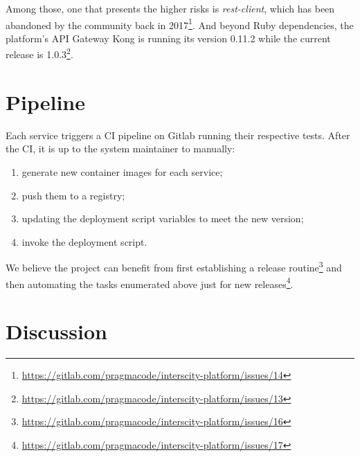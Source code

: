 \documentclass[paper=a4, fontsize=11pt]{scrartcl}
\numberwithin{equation}{section}    %
\numberwithin{figure}{section}      %
\numberwithin{table}{section}        %
\begin{document}
  Among those, one that presents the higher risks is \textit{rest-client}, which has been abandoned by the community back in 2017\footnote{\url{https://gitlab.com/pragmacode/interscity-platform/issues/14}}. And beyond Ruby dependencies, the platform's API Gateway Kong is running its version 0.11.2 while the current release is 1.0.3\footnote{\url{https://gitlab.com/pragmacode/interscity-platform/issues/13}}.

\section{Pipeline}
  Each service triggers a CI pipeline on Gitlab running their respective tests. After the CI, it is up to the system maintainer to manually:

  \begin{enumerate}
    \item generate new container images for each service;
    \item push them to a registry;
    \item updating the deployment script variables to meet the new version;
    \item invoke the deployment script.
  \end{enumerate}

  We believe the project can benefit from first establishing a release routine\footnote{\url{https://gitlab.com/pragmacode/interscity-platform/issues/16}} and then automating the tasks enumerated above just for new releases\footnote{\url{https://gitlab.com/pragmacode/interscity-platform/issues/17}}.

\section{Discussion}
\label{sec:discussion}
\end{document}
